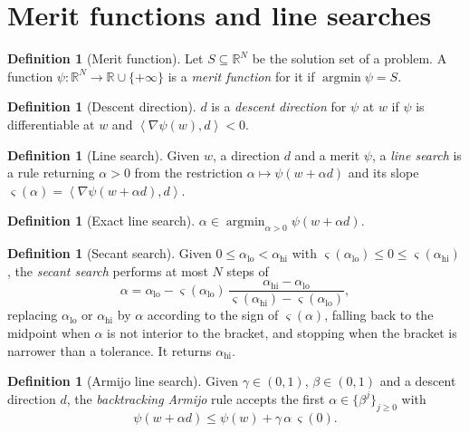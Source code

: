 \documentclass[a4paper,11pt]{book}
\theoremstyle{plain}
\theoremstyle{definition}
\newtheorem{definition}[theorem]{Definition}
\theoremstyle{remark}
\numberwithin{equation}{chapter}
\numberwithin{algorithm}{chapter}
\newcommand{\R}{\mathbb{R}}
\newcommand{\inner}[2]{\left\langle #1, #2 \right\rangle}
\DeclareMathOperator*{\argmin}{argmin}
\begin{document}
	\section{Merit functions and line searches}
	
	\begin{definition}[Merit function]
		Let $S\subseteq\R^N$ be the solution set of a problem. A function
		$\psi:\R^N\to\R\cup\{+\infty\}$ is a \emph{merit function} for it if
		$\argmin\psi=S$. 
	\end{definition}
	
	\begin{definition}[Descent direction]
		$d$ is a \emph{descent direction} for $\psi$ at $w$ if $\psi$ is differentiable
		at $w$ and $\inner{\nabla\psi(w)}{d}<0$.
	\end{definition}
	
	\begin{definition}[Line search]
		Given $w$, a direction $d$ and a merit $\psi$, a \emph{line search} is a rule
		returning $\alpha>0$ from the restriction
		$\alpha\mapsto\psi(w+\alpha d)$ and its slope
		$\varsigma(\alpha)=\inner{\nabla\psi(w+\alpha d)}{d}$.
	\end{definition}
	
	\begin{definition}[Exact line search]
		$\alpha\in\argmin_{\alpha>0}\psi(w+\alpha d)$.
	\end{definition}
	
	\begin{definition}[Secant search]
		Given $0\leq\alpha_{\mathrm{lo}}<\alpha_{\mathrm{hi}}$ with
		$\varsigma(\alpha_{\mathrm{lo}})\leq0\leq\varsigma(\alpha_{\mathrm{hi}})$, the
		\emph{secant search} performs at most $N$ steps of
		\begin{equation}
			\alpha=\alpha_{\mathrm{lo}}-\varsigma(\alpha_{\mathrm{lo}})\,
			\frac{\alpha_{\mathrm{hi}}-\alpha_{\mathrm{lo}}}
			{\varsigma(\alpha_{\mathrm{hi}})-\varsigma(\alpha_{\mathrm{lo}})},
		\end{equation}
		replacing $\alpha_{\mathrm{lo}}$ or $\alpha_{\mathrm{hi}}$ by $\alpha$
		according to the sign of $\varsigma(\alpha)$, falling back to the midpoint when
		$\alpha$ is not interior to the bracket, and stopping when the bracket is
		narrower than a tolerance. It returns $\alpha_{\mathrm{hi}}$.
	\end{definition}
	
	\begin{definition}[Armijo line search]
		Given $\gamma\in(0,1)$, $\beta\in(0,1)$ and a descent direction $d$, the
		\emph{backtracking Armijo} rule accepts the first
		$\alpha\in\{\beta^j\}_{j\geq0}$ with
		\begin{equation}
			\psi(w+\alpha d)\leq\psi(w)+\gamma\,\alpha\,\varsigma(0) .
		\end{equation}
	\end{definition}
	
\end{document}
